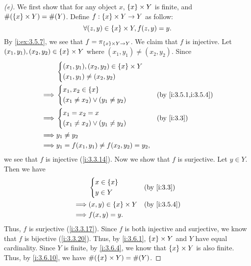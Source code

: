 \begin{proof}[(e)]
  We first show that for any object \(x\), \(\left\lbrace x\right\rbrace \times Y\) is finite, and \(\#(\left\lbrace x\right\rbrace \times Y) = \#(Y)\).
  Define \(f : \left\lbrace x\right\rbrace \times Y \to Y\) as follow:
  \[
    \forall (z, y) \in \left\lbrace x\right\rbrace \times Y, f(z, y) = y.
  \]
  By \cref{i:ex:3.5.7}, we see that \(f = \pi_{\left\lbrace x\right\rbrace \times Y \to Y}\).
  We claim that \(f\) is injective.
  Let \((x_1, y_1), (x_2, y_2) \in \left\lbrace x\right\rbrace \times Y\) where \((x_1, y_1) \neq (x_2, y_2)\).
  Since
  \begin{align*}
             & \begin{dcases}
                 (x_1, y_1), (x_2, y_2) \in \set{x} \times Y \\
                 (x_1, y_1) \neq (x_2, y_2)
               \end{dcases}        \\
    \implies & \begin{dcases}
                 x_1, x_2 \in \set{x} \\
                 (x_1 \neq x_2) \lor (y_1 \neq y_2)
               \end{dcases}             &  & \by{i:3.5.1,i:3.5.4} \\
    \implies & \begin{dcases}
                 x_1 = x_2 = x \\
                 (x_1 \neq x_2) \lor (y_1 \neq y_2)
               \end{dcases}             &  & \by{i:3.3}           \\
    \implies & y_1 \neq y_2                                       \\
    \implies & y_1 = f(x_1, y_1) \neq f(x_2, y_2) = y_2,
  \end{align*}
  we see that \(f\) is injective (\cref{i:3.3.14}).
  Now we show that \(f\) is surjective.
  Let \(y \in Y\).
  Then we have
  \begin{align*}
             & \begin{dcases}
                 x \in \set{x} \\
                 y \in Y
               \end{dcases}            &  & \by{i:3.3}       \\
    \implies & (x, y) \in \set{x} \times Y &  & \by{i:3.5.4} \\
    \implies & f(x, y) = y.
  \end{align*}
  Thus, \(f\) is surjective (\cref{i:3.3.17}).
  Since \(f\) is both injective and surjective, we know that \(f\) is bijective (\cref{i:3.3.20}).
  Thus, by \cref{i:3.6.1}, \(\left\lbrace x\right\rbrace \times Y\) and \(Y\) have equal cardinality.
  Since \(Y\) is finite, by \cref{i:3.6.4}, we know that \(\left\lbrace x\right\rbrace \times Y\) is also finite.
  Thus, by \cref{i:3.6.10}, we have \(\#(\left\lbrace x\right\rbrace \times Y) = \#(Y)\).


\end{proof}
